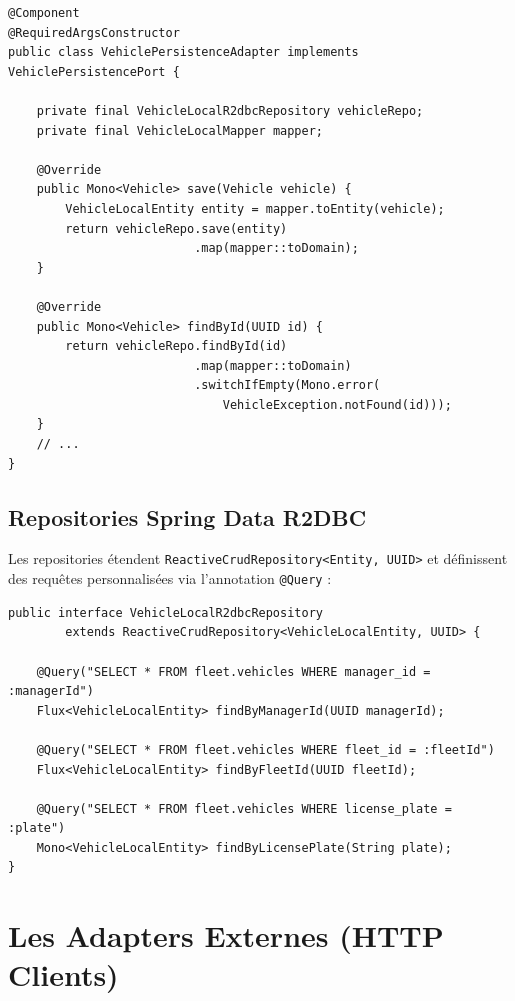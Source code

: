 \documentclass[12pt,a4paper]{report}
\begin{document}
\begin{lstlisting}[style=javaStyle, caption={Pattern d'un adapter de persistance R2DBC}]
@Component
@RequiredArgsConstructor
public class VehiclePersistenceAdapter implements VehiclePersistencePort {

    private final VehicleLocalR2dbcRepository vehicleRepo;
    private final VehicleLocalMapper mapper;

    @Override
    public Mono<Vehicle> save(Vehicle vehicle) {
        VehicleLocalEntity entity = mapper.toEntity(vehicle);
        return vehicleRepo.save(entity)
                          .map(mapper::toDomain);
    }

    @Override
    public Mono<Vehicle> findById(UUID id) {
        return vehicleRepo.findById(id)
                          .map(mapper::toDomain)
                          .switchIfEmpty(Mono.error(
                              VehicleException.notFound(id)));
    }
    // ...
}
\end{lstlisting}

\subsection{Repositories Spring Data R2DBC}

Les repositories étendent \texttt{ReactiveCrudRepository<Entity, UUID>} et définissent des requêtes personnalisées via l'annotation \texttt{@Query} :

\begin{lstlisting}[style=javaStyle, caption={Exemple de repository R2DBC avec requêtes personnalisées}]
public interface VehicleLocalR2dbcRepository
        extends ReactiveCrudRepository<VehicleLocalEntity, UUID> {

    @Query("SELECT * FROM fleet.vehicles WHERE manager_id = :managerId")
    Flux<VehicleLocalEntity> findByManagerId(UUID managerId);

    @Query("SELECT * FROM fleet.vehicles WHERE fleet_id = :fleetId")
    Flux<VehicleLocalEntity> findByFleetId(UUID fleetId);

    @Query("SELECT * FROM fleet.vehicles WHERE license_plate = :plate")
    Mono<VehicleLocalEntity> findByLicensePlate(String plate);
}
\end{lstlisting}

\section{Les Adapters Externes (HTTP Clients)}
\end{document}
